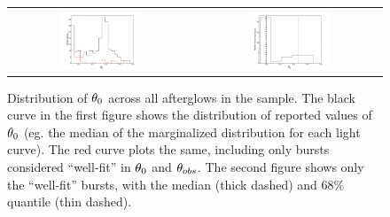 \begin{figure}
	\begin{center}
	\begin{tabular}{cc}
    		\includegraphics[width=0.45\textwidth]{figures/scalefit/distribution_Th0.pdf} & \includegraphics[width=0.45\textwidth]{figures/scalefit/distribution_cut_Th0.pdf}
    	\end{tabular}
    	\end{center}
	\caption{ Distribution of $\theta_0$ across all afterglows in the sample. The black curve in the first figure shows the distribution of reported values of $\theta_0$ (eg. the median of the marginalized distribution for each light curve).  The red curve plots the same, including only bursts considered ``well-fit'' in $\theta_0$ and $\theta_{obs}$.  The second figure shows only the ``well-fit'' bursts, with the median (thick dashed) and  68\% quantile (thin dashed).}
\end{figure}

